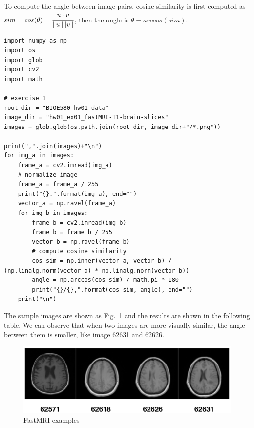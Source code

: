 \documentclass[11pt,a4paper]{article}
\begin{document}
To compute the angle between image pairs, cosine similarity is first computed as $sim=cos(\theta)=\cfrac{u\cdot v}{\|u\| \|v\|}$, then the angle is $\theta=arccos(sim)$. 

\begin{lstlisting}
import numpy as np
import os 
import glob
import cv2
import math

# exercise 1
root_dir = "BIOE580_hw01_data"
image_dir = "hw01_ex01_fastMRI-T1-brain-slices"
images = glob.glob(os.path.join(root_dir, image_dir+"/*.png"))

print(",".join(images)+"\n")
for img_a in images:
    frame_a = cv2.imread(img_a)
    # normalize image 
    frame_a = frame_a / 255
    print("{}:".format(img_a), end="")
    vector_a = np.ravel(frame_a)
    for img_b in images:
        frame_b = cv2.imread(img_b)
        frame_b = frame_b / 255
        vector_b = np.ravel(frame_b)
        # compute cosine similarity
        cos_sim = np.inner(vector_a, vector_b) / (np.linalg.norm(vector_a) * np.linalg.norm(vector_b))
        angle = np.arccos(cos_sim) / math.pi * 180
        print("{}/{},".format(cos_sim, angle), end="")
    print("\n")
\end{lstlisting}

The sample images are shown as Fig.~\ref{fig:ex1_samp} and the results are shown in the following table. We can observe that when two images are more visually similar, the angle between them is smaller, like image 62631 and 62626. 

\begin{figure}[!ht]
    \centering
    \includegraphics[width=0.8\linewidth]{ex1_samples.png}
    \caption{FastMRI examples}
    \label{fig:ex1_samp}
\end{figure}
\end{document}
